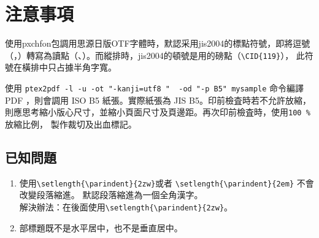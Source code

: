 \section{注意事項}

\par%
使用pxchfon包調用思源日版OTF字體時，默認采用jis2004的標點符號，即將逗號%
（，）轉寫為讀點（、）。而縱排時，jis2004的頓號是用的磅點（\verb+\CID{119}+），
此符號在橫排中只占據半角字寬。

\vspace{5mm}
\par%
使用 {\color{red}\verb+ptex2pdf -l -u -ot "-kanji=utf8 "  -od "-p B5" mysample+}
 命令編譯 PDF ，則會調用 ISO B5 紙張。實際紙張為 JIS B5。印前檢査時若不允許放縮，
 則應思考縮小版心尺寸，並縮小頁面尺寸及頁邊距。再次印前檢査時，使用{\color{red}\verb+100 % +} 放縮比例，
 製作裁切及出血標記。

\subsection{已知問題}

\begin{enumerate}
\item 使用{\color{red}\verb+\setlength{\parindent}{2zw}+}或者
{\color{red}\verb+\setlength{\parindent}{2em}+} 不會改變段落縮進。
默認段落縮進為一個全角漢字。\\
解決辦法：在\verb++後面使用{\color{red}\verb+\setlength{\parindent}{2zw}+}。
\item 部標題既不是水平居中，也不是垂直居中。
\end{enumerate}

